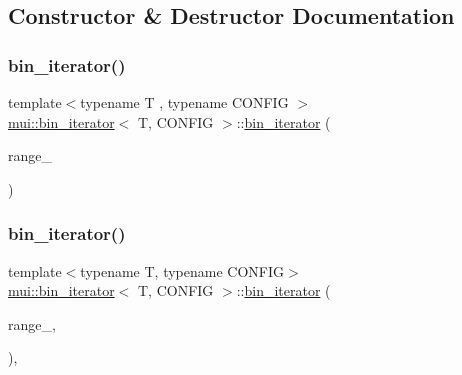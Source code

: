 \subsection{Constructor \& Destructor Documentation}
\mbox{\label{structmui_1_1bin__iterator_ad4a934e39ea52abb9b9df227826e784b}} 
\subsubsection{\texorpdfstring{bin\+\_\+iterator()}{bin\_iterator()}\hspace{0.1cm}{\footnotesize\ttfamily [1/3]}}
{\footnotesize\ttfamily template$<$typename T , typename C\+O\+N\+F\+IG $>$ \\
\hyperlink{structmui_1_1bin__iterator}{mui\+::bin\+\_\+iterator}$<$ T, C\+O\+N\+F\+IG $>$\+::\hyperlink{structmui_1_1bin__iterator}{bin\+\_\+iterator} (\begin{DoxyParamCaption}\item[{const \hyperlink{structmui_1_1bin__range}{bin\+\_\+range}$<$ T, C\+O\+N\+F\+IG $>$ \&}]{range\+\_\+ }\end{DoxyParamCaption})}

\mbox{\label{structmui_1_1bin__iterator_a28e68216dd247d68b9c60f99c13631c5}} 
\subsubsection{\texorpdfstring{bin\+\_\+iterator()}{bin\_iterator()}\hspace{0.1cm}{\footnotesize\ttfamily [2/3]}}
{\footnotesize\ttfamily template$<$typename T, typename C\+O\+N\+F\+IG$>$ \\
\hyperlink{structmui_1_1bin__iterator}{mui\+::bin\+\_\+iterator}$<$ T, C\+O\+N\+F\+IG $>$\+::\hyperlink{structmui_1_1bin__iterator}{bin\+\_\+iterator} (\begin{DoxyParamCaption}\item[{const \hyperlink{structmui_1_1bin__range}{bin\+\_\+range}$<$ T, C\+O\+N\+F\+IG $>$ \&}]{range\+\_\+,  }\item[{int}]{ }\end{DoxyParamCaption})\hspace{0.3cm}{\ttfamily [inline]}, {\ttfamily [explicit]}}

